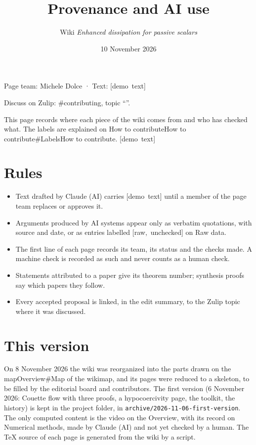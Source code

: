 \documentclass[11pt]{article}
\makeatletter
\theoremstyle{definition}
\theoremstyle{remark}
\newcommand{\ed@label}[1]{\mbox{\footnotesize[#1]}}
\newcommand{\demo}[1]{\ed@label{demo text}}
\newcommand{\raw}[1]{\ed@label{raw, unchecked}}
\def\ed@title{}\let\ed@maketitle\maketitle\renewcommand{\maketitle}{\let\ed@title\@title\ed@maketitle}
\newcommand{\pagestatus}[1]{{\par\centering\small#1\par}}
\newcommand{\zulip}[2][]{{\par\centering\small Discuss on Zulip: \##2, topic
  ``\ifx\relax#1\relax\ed@title\else#1\fi''.\par}\medskip}
\newcommand{\wikilink}[2]{\ifx\relax#2\relax#1\else#2\fi}
\makeatother
\begin{document}
\title{Provenance and AI use}
\author{Wiki \emph{Enhanced dissipation for passive scalars}}
\date{10 November 2026}
\maketitle
\pagestatus{Page team: Michele Dolce · Text: \demo{}}
\zulip{contributing}

This page records where each piece of the wiki comes from and who has checked what. The labels are explained on \wikilink{How to contribute\#Labels}{How to contribute}. \demo{}

\section{Rules}
\begin{itemize}
  \item Text drafted by Claude (AI) carries \demo{} until a member of the page team replaces or approves it.
  \item Arguments produced by AI systems appear only as verbatim quotations, with source and date, or as entries labelled \raw{} on \wikilink{Raw data}{}.
  \item The first line of each page records its team, its status and the checks made. A machine check is recorded as such and never counts as a human check.
  \item Statements attributed to a paper give its theorem number; synthesis proofs say which papers they follow.
  \item Every accepted proposal is linked, in the edit summary, to the Zulip topic where it was discussed.
\end{itemize}

\section{This version}
On 8 November 2026 the wiki was reorganized into the parts drawn on the \wikilink{Overview\#Map of the wiki}{map}, and its pages were reduced to a skeleton, to be filled by the editorial board and contributors. The first version (6 November 2026: Couette flow with three proofs, a hypocoercivity page, the toolkit, the history) is kept in the project folder, in \texttt{archive/2026-11-06-first-version}. The only computed content is the video on the Overview, with its record on \wikilink{Numerical methods}{}, made by Claude (AI) and not yet checked by a human. The TeX source of each page is generated from the wiki by a script.
\end{document}
